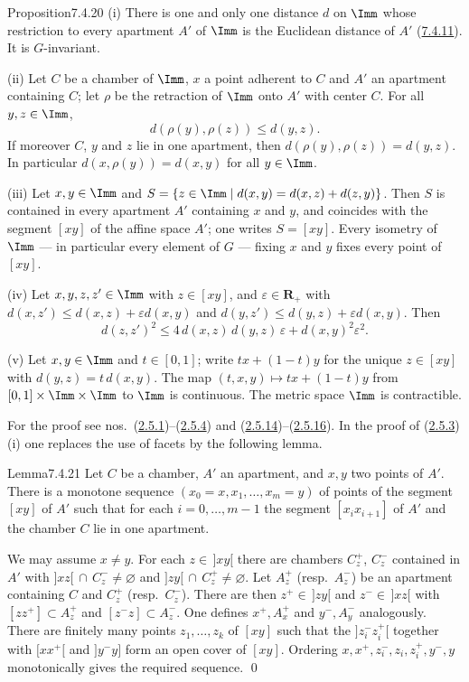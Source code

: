 \documentclass[12pt,a4paper,oneside,english]{smfart}
\makeatletter
\newcommand{\btanchor}[1]{\leavevmode\Hy@raisedlink{\hypertarget{bt:#1}{}}}
\newcommand{\btref}[1]{\hyperlink{bt:#1}{#1}}
\theoremstyle{definition}
\theoremstyle{bt}
\makeatother
\begin{document}
\begin{stmt}{Proposition}{7.4.20}\btanchor{7.4.20}
(i) There is one and only one distance $d$ on $\Imm$ whose restriction to every
apartment $A'$ of $\Imm$ is the Euclidean distance of $A'$ \textup{(\btref{7.4.11})}. It is
$G$-invariant.

(ii) Let $C$ be a chamber of $\Imm$, $x$ a point adherent to $C$ and $A'$ an
apartment containing $C$; let $\rho$ be the retraction of $\Imm$ onto $A'$ with
center $C$. For all $y,z\in\Imm$,
\[
  d(\rho(y),\rho(z))\leqslant d(y,z).
\]
If moreover $C$, $y$ and $z$ lie in one apartment, then
$d(\rho(y),\rho(z))=d(y,z)$. In particular $d(x,\rho(y))=d(x,y)$ for all $y\in\Imm$.

(iii) Let $x,y\in\Imm$ and $S=\{z\in\Imm\mid d(x,y)=d(x,z)+d(z,y)\}$. Then $S$ is
contained in every apartment $A'$ containing $x$ and $y$, and coincides with the
segment $[xy]$ of the affine space $A'$; one writes $S=[xy]$. Every isometry of
$\Imm$ --- in particular every element of $G$ --- fixing $x$ and $y$ fixes every
point of $[xy]$.

(iv) Let $x,y,z,z'\in\Imm$ with $z\in[xy]$, and $\varepsilon\in\mathbf{R}_{+}$ with
$d(x,z')\leqslant d(x,z)+\varepsilon d(x,y)$ and
$d(y,z')\leqslant d(y,z)+\varepsilon d(x,y)$. Then
\[
  d(z,z')^{2}\leqslant4\,d(x,z)\,d(y,z)\,\varepsilon+d(x,y)^{2}\varepsilon^{2}.
\]

(v) Let $x,y\in\Imm$ and $t\in[0,1]$; write $tx+(1-t)y$ for the unique $z\in[xy]$
with $d(y,z)=t\,d(x,y)$. The map $(t,x,y)\mapsto tx+(1-t)y$ from
$[0,1]\times\Imm\times\Imm$ to $\Imm$ is continuous. The metric space $\Imm$ is
contractible.
\end{stmt}

For the proof see nos.\ (\btref{2.5.1})--(\btref{2.5.4}) and (\btref{2.5.14})--(\btref{2.5.16}). In the proof of
(\btref{2.5.3})\,(i) one replaces the use of facets by the following lemma.

\begin{stmt}{Lemma}{7.4.21}\btanchor{7.4.21}
Let $C$ be a chamber, $A'$ an apartment, and $x,y$ two points of $A'$. There is a
monotone sequence $(x_0=x,x_1,\dots,x_m=y)$ of points of the segment $[xy]$ of $A'$
such that for each $i=0,\dots,m-1$ the segment $[x_ix_{i+1}]$ of $A'$ and the
chamber $C$ lie in one apartment.
\end{stmt}

\pf We may assume $x\neq y$. For each $z\in\,]xy[$ there are chambers $C_z^{+}$,
$C_z^{-}$ contained in $A'$ with $]xz[\,\cap\,C_z^{-}\neq\varnothing$ and
$]zy[\,\cap\,C_z^{+}\neq\varnothing$. Let $A_z^{+}$ (resp.\ $A_z^{-}$) be an
apartment containing $C$ and $C_z^{+}$ (resp.\ $C_z^{-}$). There are then
$z^{+}\in\,]zy[$ and $z^{-}\in\,]xz[$ with $[zz^{+}]\subset A_z^{+}$ and
$[z^{-}z]\subset A_z^{-}$. One defines $x^{+},A_x^{+}$ and $y^{-},A_y^{-}$
analogously. There are finitely many points $z_1,\dots,z_k$ of $[xy]$ such that the
$]z_i^{-}z_i^{+}[$ together with $[xx^{+}[$ and $]y^{-}y]$ form an open cover of
$[xy]$. Ordering $x,x^{+},z_i^{-},z_i,z_i^{+},y^{-},y$ monotonically gives the
required sequence. \qed
\end{document}
